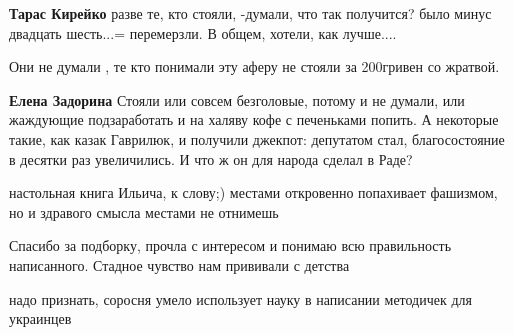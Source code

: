 \begin{itemize}
\begin{itemize}
\textbf{Тарас Кирейко} разве те, кто стояли, -думали, что так получится? было минус двадцать шесть...= перемерзли. В общем, хотели, как лучше....

 
Они не думали , те кто понимали эту аферу не стояли за 200гривен со жратвой.

 
\textbf{Елена Задорина} Стояли или совсем безголовые, потому и не думали, или
жаждующие подзаработать и на халяву кофе с печеньками попить. А некоторые
такие, как казак Гаврилюк, и получили джекпот: депутатом стал, благосостояние в
десятки раз увеличились. И что ж он для народа сделал в Раде?
\end{itemize}

 
настольная книга Ильича, к слову;) местами откровенно попахивает фашизмом, но и здравого смысла местами не отнимешь

 
Спасибо за подборку, прочла с интересом и понимаю всю правильность написанного. Стадное чувство нам прививали с детства

 
надо признать, соросня умело использует науку в написании методичек для украинцев


\end{itemize}
